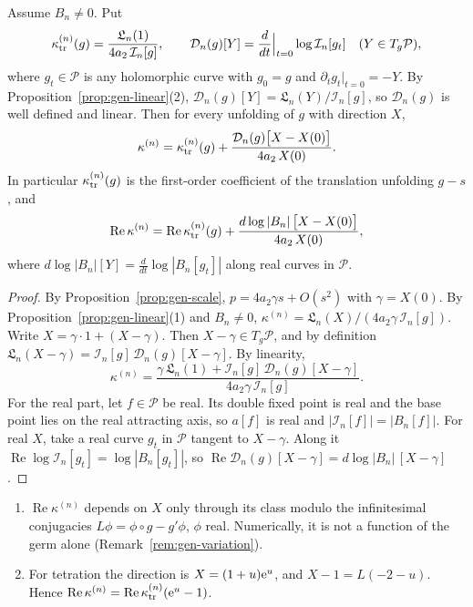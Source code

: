 \begin{theorem}\label{thm:gen-variation}
Assume $B_n\ne0$.  Put
\[
 \kappa^{(n)}_{\rm tr}(g)=\frac{\mathfrak L_n(1)}{4a_2\,\mathcal I_n[g]},\qquad
 \mathcal D_n(g)[Y]=\frac{d}{dt}\Big|_{t=0}\log\mathcal I_n[g_t]\quad(Y\in T_g\mathcal P),
\]
where $g_t\in\mathcal P$ is any holomorphic curve with $g_0=g$ and
$\partial_tg_t|_{t=0}=-Y$.  By Proposition~\ref{prop:gen-linear}(2),
$\mathcal D_n(g)[Y]=\mathfrak L_n(Y)/\mathcal I_n[g]$, so $\mathcal D_n(g)$ is well defined
and linear.
Then for every unfolding of $g$ with direction $X$,
\[
 \kappa^{(n)}=\kappa^{(n)}_{\rm tr}(g)+\frac{\mathcal D_n(g)\bigl[X-X(0)\bigr]}{4a_2\,X(0)} .
\]
In particular $\kappa^{(n)}_{\rm tr}(g)$ is the first-order coefficient of the
translation unfolding $g-s$, and
\[
 \operatorname{Re}\kappa^{(n)}=\operatorname{Re}\kappa^{(n)}_{\rm tr}(g)
 +\frac{d\log|B_n|\,\bigl[X-X(0)\bigr]}{4a_2\,X(0)},
\]
where $d\log|B_n|[Y]=\frac{d}{dt}\log|B_n[g_t]|$ along real curves in $\mathcal P$.
\end{theorem}

\begin{proof}
By Proposition~\ref{prop:gen-scale}, $p=4a_2\gamma s+O(s^2)$ with
$\gamma=X(0)$.  By Proposition~\ref{prop:gen-linear}(1) and $B_n\ne0$,
$\kappa^{(n)}=\mathfrak L_n(X)/(4a_2\gamma\,\mathcal I_n[g])$.  Write
$X=\gamma\cdot1+(X-\gamma)$.  Then $X-\gamma\in T_g\mathcal P$, and
by definition $\mathfrak L_n(X-\gamma)=\mathcal I_n[g]\,\mathcal D_n(g)[X-\gamma]$.  By linearity,
\[
 \kappa^{(n)}=\frac{\gamma\,\mathfrak L_n(1)+\mathcal I_n[g]\,\mathcal D_n(g)[X-\gamma]}
 {4a_2\gamma\,\mathcal I_n[g]} .
\]
For the real part, let $f\in\mathcal P$ be real.  Its double fixed point is
real and the base point lies on the real attracting axis, so $a[f]$ is real
and $|\mathcal I_n[f]|=|B_n[f]|$.  For real $X$, take a real curve $g_t$ in
$\mathcal P$ tangent to $X-\gamma$.  Along it
$\operatorname{Re}\log\mathcal I_n[g_t]=\log|B_n[g_t]|$, so
$\operatorname{Re}\mathcal D_n(g)[X-\gamma]=d\log|B_n|\,[X-\gamma]$.
\end{proof}

\begin{corollary}\label{cor:gen-variation}
\begin{enumerate}
\item $\operatorname{Re}\kappa^{(n)}$ depends on $X$ only through its class
  modulo the infinitesimal conjugacies $L\phi=\phi\circ g-g'\phi$, $\phi$ real.
  Numerically, it is not a function of the germ alone
  (Remark~\ref{rem:gen-variation}).
\item For tetration the direction is $X=(1+u)\mathrm{e}^u$, and $X-1=L(-2-u)$.
  Hence $\operatorname{Re}\kappa^{(n)}=\operatorname{Re}\kappa^{(n)}_{\rm tr}(\mathrm{e}^u-1)$.
\end{enumerate}
\end{corollary}

